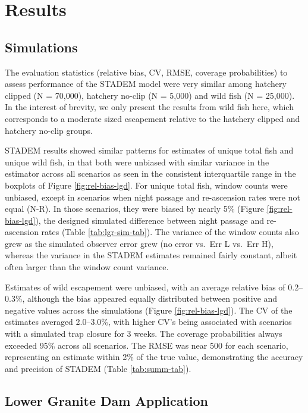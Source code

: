 \documentclass[
  12pt,
]{article}
\begin{document}
\hypertarget{results}{%
\section{Results}\label{results}}

\hypertarget{simulations-1}{%
\subsection{Simulations}\label{simulations-1}}

The evaluation statistics (relative bias, CV, RMSE, coverage probabilities) to assess performance of the STADEM model were very similar among hatchery clipped (N = 70,000), hatchery no-clip (N = 5,000) and wild fish (N = 25,000). In the interest of brevity, we only present the results from wild fish here, which corresponds to a moderate sized escapement relative to the hatchery clipped and hatchery no-clip groups.

STADEM results showed similar patterns for estimates of unique total fish and unique wild fish, in that both were unbiased with similar variance in the estimator across all scenarios as seen in the consistent interquartile range in the boxplots of Figure \ref{fig:rel-bias-lgd}. For unique total fish, window counts were unbiased, except in scenarios when night passage and re-ascension rates were not equal (N-R). In those scenarios, they were biased by nearly 5\% (Figure \ref{fig:rel-bias-lgd}), the designed simulated difference between night passage and re-ascension rates (Table \ref{tab:lgr-sim-tab}). The variance of the window counts also grew as the simulated observer error grew (no error vs.~Err L vs.~Err H), whereas the variance in the STADEM estimates remained fairly constant, albeit often larger than the window count variance.

Estimates of wild escapement were unbiased, with an average relative bias of 0.2--0.3\%, although the bias appeared equally distributed between positive and negative values across the simulations (Figure \ref{fig:rel-bias-lgd}). The CV of the estimates averaged 2.0--3.0\%, with higher CV's being associated with scenarios with a simulated trap closure for 3 weeks. The coverage probabilities always exceeded 95\% across all scenarios. The RMSE was near 500 for each scenario, representing an estimate within 2\% of the true value, demonstrating the accuracy and precision of STADEM (Table \ref{tab:summ-tab}).

\hypertarget{lower-granite-dam-application-1}{%
\subsection{Lower Granite Dam Application}\label{lower-granite-dam-application-1}}
\end{document}
